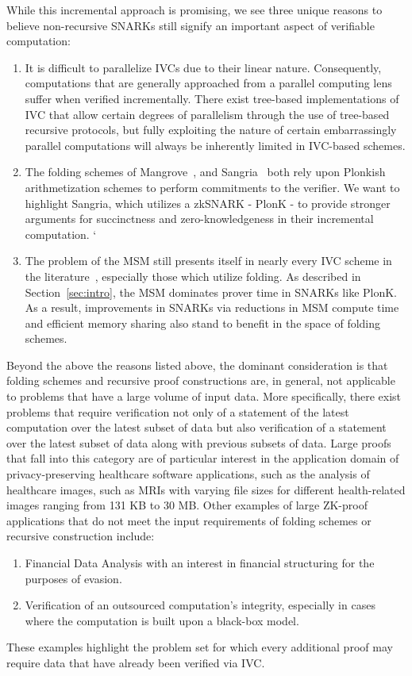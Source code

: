 \documentclass[sigconf]{acmart}
\begin{document}
While this incremental approach is promising, we see three unique reasons to believe non-recursive SNARKs still signify an important aspect of verifiable computation: 
\begin{enumerate}
    \item It is difficult to parallelize IVCs due to their linear nature. Consequently, computations that are generally approached from a parallel computing lens suffer when verified incrementally. There exist tree-based implementations of IVC that allow certain degrees of parallelism through the use of tree-based recursive protocols, but fully exploiting the nature of certain embarrassingly parallel computations will always be inherently limited in IVC-based schemes. 
    \item The folding schemes of Mangrove~\cite{Mangrove}, and Sangria~\cite{Sangria} both rely upon Plonkish arithmetization schemes to perform commitments to the verifier. We want to highlight Sangria, which utilizes a zkSNARK - PlonK - to provide stronger arguments for succinctness and zero-knowledgeness in their incremental computation. 
`    \item The problem of the MSM still presents itself in nearly every IVC scheme in the literature~\cite{ZKfolding,Mangrove,Sangria,ZcashWhitepaper,spartan,ZKfolding}, especially those which utilize folding. As described in Section~\ref{sec:intro}, the MSM dominates prover time in SNARKs like PlonK. As a result, improvements in SNARKs via reductions in MSM compute time and efficient memory sharing also stand to benefit in the space of folding schemes.
\end{enumerate}

Beyond the above the reasons listed above, the dominant consideration is that 
folding schemes and recursive proof constructions are, in general, not applicable to problems that have a large volume of input data. More specifically, there exist problems that require verification not only of a statement of the latest computation over the latest subset of data but also verification of a statement over the latest subset of data along with previous subsets of data. Large proofs that fall into this category are of particular interest in the application domain of privacy-preserving healthcare software applications, such as the analysis of healthcare images, such as MRIs \cite{VerfAIMedPooyan} with varying file sizes for different health-related images ranging from 131 KB to 30 MB. Other examples of large ZK-proof applications that do not meet the input requirements of folding schemes or recursive construction include:
\begin{enumerate}
    \item Financial Data Analysis with an interest in financial structuring for the purposes of evasion.
    \item Verification of an outsourced computation's integrity, especially in cases where the computation is built upon a black-box model.
\end{enumerate}
These examples highlight the problem set for which every additional proof may require data that have already been verified via IVC. 
\end{document}
